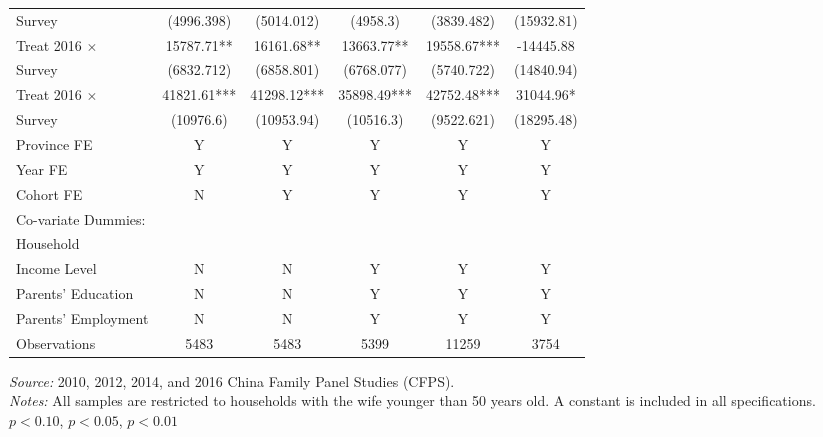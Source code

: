 \documentclass[12pt]{extarticle}
\begin{document}
\begin{table}[h]
\begin{threeparttable}
\begin{tabular}{l*{5}{c}}
\quad 2012 Survey         &  (4996.398)   &  (5014.012)   &    (4958.3)   &  (3839.482)   &  (15932.81)   \\
Treat 2016 $\times$ &    15787.71** &    16161.68** &    13663.77** &    19558.67***&   -14445.88   \\
\quad 2014 Survey         &  (6832.712)   &  (6858.801)   &  (6768.077)   &  (5740.722)   &  (14840.94)   \\
Treat 2016 $\times$ &    41821.61***&    41298.12***&    35898.49***&    42752.48***&    31044.96*  \\
\quad 2016 Survey         &   (10976.6)   &  (10953.94)   &   (10516.3)   &  (9522.621)   &  (18295.48)   \\
\hline
Province FE &  Y &  Y & Y & Y & Y \\
Year FE &  Y &  Y & Y & Y & Y \\
Cohort FE & N & Y & Y & Y & Y \\
Co-variate Dummies: \\
\quad Household \\
\qquad Income Level & N & N & Y & Y & Y \\
\quad Parents' Education &  N &  N & Y & Y & Y \\
\quad Parents' Employment &  N &  N & Y & Y & Y \\
\hline
Observations        &        5483   &        5483   &        5399   &       11259   &        3754   \\
\hline\hline
\end{tabular}
\begin{tablenotes}
\footnotesize \textit{Source:} 2010, 2012, 2014, and 2016 China Family Panel Studies (CFPS). \\
\textit{Notes:} All samples are restricted to households with the wife younger than 50 years old. A constant is included in all specifications. \\
\quad \sym{*} \(p<0.10\), \sym{**} \(p<0.05\), \sym{***} \(p<0.01\)
\end{tablenotes}
\end{threeparttable}
\end{table}
\end{document}
